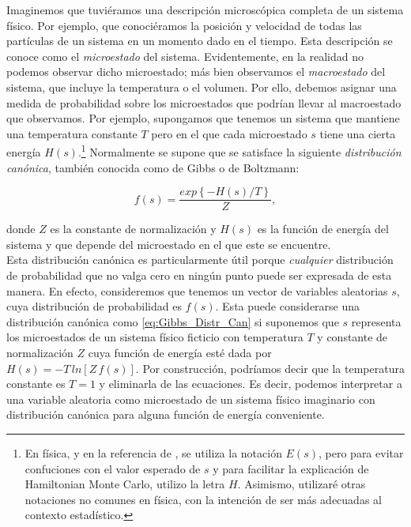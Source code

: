  Imaginemos que tuviéramos una descripción microscópica completa de un sistema físico. Por ejemplo, que conociéramos la posición y velocidad de todas las partículas de un sistema en un momento dado en el tiempo. Esta descripción se conoce como el \textit{microestado} del sistema. Evidentemente, en la realidad no podemos observar dicho microestado; más bien observamos el \textit{macroestado} del sistema, que incluye la temperatura o el volumen. Por ello, debemos asignar una medida de probabilidad sobre los microestados que podrían llevar al macroestado que observamos. Por ejemplo, supongamos que tenemos un sistema que mantiene una temperatura constante $T$ pero en el que cada microestado $s$ tiene una cierta energía $H(s)$.\footnote{En física, y en la referencia de \textcite{Neal93}, se utiliza la notación $E(s)$, pero para evitar confuciones con el valor esperado de $s$ y para facilitar la explicación de Hamiltonian Monte Carlo, utilizo la letra $H$. Asimismo, utilizaré otras notaciones no comunes en física, con la intención de ser más adecuadas al contexto estadístico.} Normalmente se supone que se satisface la siguiente \textit{distribución canónica}, también conocida como de Gibbs o de Boltzmann: 
 
\begin{equation}
\label{eq:Gibbs_Distr_Can}
 f(s) = \dfrac{exp\left\lbrace-H(s)/T\right\rbrace}{Z},
\end{equation}
 
 donde $Z$ es la constante de normalización y $H(s)$ es la función de energía del sistema y que depende del microestado en el que este se encuentre.\\
 
 Esta distribución canónica es particularmente útil porque \textit{cualquier} distribución de probabilidad que no valga cero en ningún punto puede ser expresada de esta manera. En efecto, consideremos que tenemos un vector de variables aleatorias $s$, cuya distribución de probabilidad es $f(s)$. Esta puede considerarse una distribución canónica como \eqref{eq:Gibbs_Distr_Can} si suponemos que $s$ representa los microestados de un sistema físico ficticio con temperatura $T$ y constante de normalización $Z$ cuya función de energía esté dada por $H(s) = -T\,ln\left[Z\,f(s)\right]$. Por construcción, podríamos decir que la temperatura constante es $T=1$ y eliminarla de las ecuaciones. Es decir, podemos interpretar a una variable aleatoria como microestado de un sistema físico imaginario con distribución canónica para alguna función de energía conveniente.\\
 

